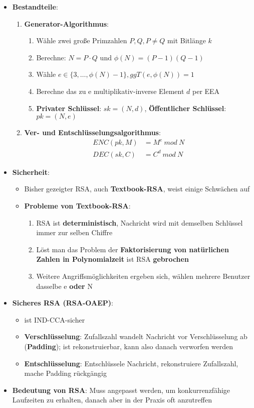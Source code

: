 \begin{itemize}
	\item \textbf{Bestandteile}:
	\begin{enumerate}
		\item \textbf{Generator-Algorithmus}:
		\begin{enumerate}
			\item Wähle zwei große Primzahlen $P, Q, P \neq Q$ mit Bitlänge $k$
			\item Berechne: $N = P \cdot Q$ und $\phi(N) = (P - 1)(Q - 1)$
			\item Wähle $e \in \{3, \dots, \phi(N) - 1\}, ggT(e, \phi(N)) = 1$
			\item Berechne das zu e multiplikativ-inverse Element $d$ per EEA
			\item \textbf{Privater Schlüssel}: $sk = (N, d)$, \textbf{Öffentlicher Schlüssel}: $pk = (N, e)$
		\end{enumerate}
		\item \textbf{Ver- und Entschlüsselungsalgorithmus}:
		\begin{align*}
			ENC(pk, M) &= M^e\ mod\ N\\
			DEC(sk, C) &= C^d\ mod\ N
		\end{align*}
	\end{enumerate}
	\item \textbf{Sicherheit}:
	\begin{itemize}
		\item Bisher gezeigter RSA, auch \textbf{Textbook-RSA}, weist einige Schwächen auf
		\item \textbf{Probleme von Textbook-RSA}:
		\begin{enumerate}
			\item RSA ist \textbf{deterministisch}, Nachricht wird mit demselben Schlüssel immer zur selben Chiffre
			\item Löst man das Problem der \textbf{Faktorisierung von natürlichen Zahlen in Polynomialzeit} ist RSA \textbf{gebrochen}
			\item Weitere Angriffsmöglichkeiten ergeben sich, wählen mehrere Benutzer dasselbe e \textbf{oder} N
		\end{enumerate}
	\end{itemize}
	\item \textbf{Sicheres RSA (RSA-OAEP)}:
	\begin{itemize}
		\item {} ist IND-CCA-sicher
		\item \textbf{Verschlüsselung}: Zufallszahl wandelt Nachricht vor Verschlüsselung ab (\textbf{Padding}); ist rekonstruierbar, kann also danach verworfen werden
		\item \textbf{Entschlüsselung}: Entschlüssele Nachricht, rekonstruiere Zufallszahl, mache Padding rückgängig
	\end{itemize}
	\item \textbf{Bedeutung von RSA}: Muss angepasst werden, um konkurrenzfähige Laufzeiten zu erhalten, danach aber in der Praxis oft anzutreffen
\end{itemize}

